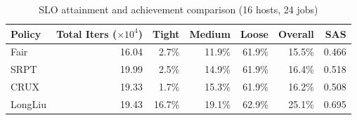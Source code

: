 \begin{table}[t]
\centering
\caption{SLO attainment and achievement comparison (16 hosts, 24 jobs)}
\label{tab:slo_16host}
\begin{tabular}{l|r|r|r|r|r|r}
\hline
Policy & Total Iters ($\times 10^4$) & Tight & Medium & Loose & Overall & SAS \\
\hline
Fair & 16.04 & 2.7\% & 11.9\% & 61.9\% & 15.5\% & 0.466 \\
SRPT & 19.99 & 2.5\% & 14.9\% & 61.9\% & 16.4\% & 0.518 \\
CRUX & 19.33 & 1.7\% & 15.3\% & 61.9\% & 16.2\% & 0.508 \\
LongLiu & 19.43 & 16.7\% & 19.1\% & 62.9\% & 25.1\% & 0.695 \\
\hline
\end{tabular}
\end{table}

